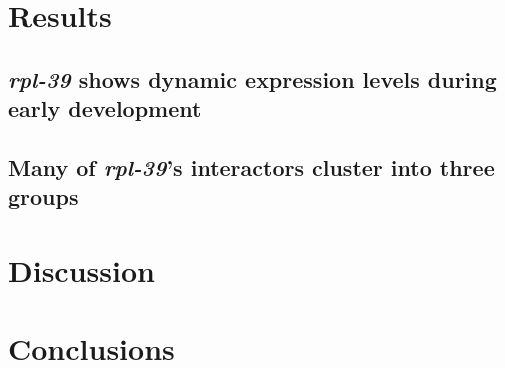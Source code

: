\documentclass{article}[12pt]
\begin{document}
\section{Results}
\subsection{\emph{rpl-39} shows dynamic expression levels during early development}


\subsection{Many of \emph{rpl-39}'s interactors cluster into three groups}



\section{Discussion}


\section{Conclusions}

\printbibliography
\end{document}
